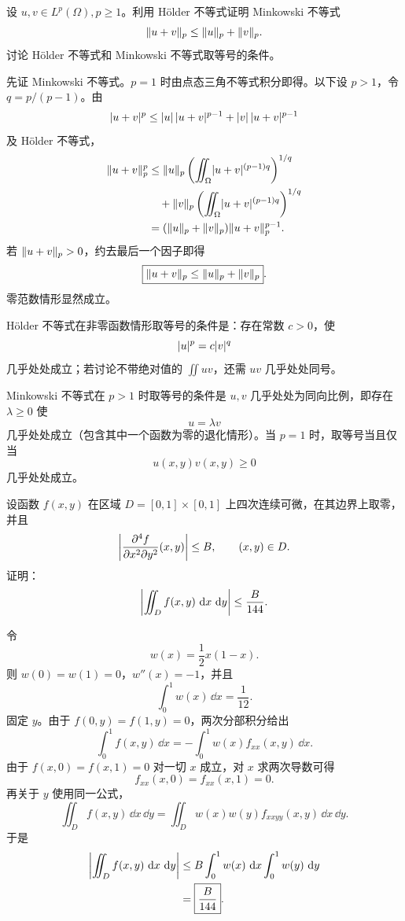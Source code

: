 \begin{xreferenceproblem}[7]
设 $u,v\in L^p(\Omega),p\ge1$。利用 Hölder 不等式证明 Minkowski 不等式
  \[
    \norm{u+v}_p\le\norm{u}_p+\norm{v}_p.
  \]
  讨论 Hölder 不等式和 Minkowski 不等式取等号的条件。
\end{xreferenceproblem}
\begin{xsolution}
先证 Minkowski 不等式。$p=1$ 时由点态三角不等式积分即得。以下设 $p>1$，令 $q=p/(p-1)$。由
\[
  \abs{u+v}^p\le\abs{u}\,\abs{u+v}^{p-1}
  +\abs{v}\,\abs{u+v}^{p-1}
\]
及 Hölder 不等式，
\begin{align*}
  \norm{u+v}_p^p
  &\le \norm{u}_p
  \left(\iint_\Omega\abs{u+v}^{(p-1)q}\right)^{1/q}\\
  &\quad+\norm{v}_p
  \left(\iint_\Omega\abs{u+v}^{(p-1)q}\right)^{1/q}\\
  &=(\norm{u}_p+\norm{v}_p)\norm{u+v}_p^{p-1}.
\end{align*}
若 $\norm{u+v}_p>0$，约去最后一个因子即得
\[
  \boxed{\norm{u+v}_p\le\norm{u}_p+\norm{v}_p}.
\]
零范数情形显然成立。

Hölder 不等式在非零函数情形取等号的条件是：存在常数 $c>0$，使
\[
  \abs{u}^p=c\abs{v}^q
\]
几乎处处成立；若讨论不带绝对值的 $\iint uv$，还需 $uv$ 几乎处处同号。

Minkowski 不等式在 $p>1$ 时取等号的条件是 $u,v$ 几乎处处为同向比例，即存在 $\lambda\ge0$ 使
\[
  u=\lambda v
\]
几乎处处成立（包含其中一个函数为零的退化情形）。当 $p=1$ 时，取等号当且仅当
\[
  u(x,y)v(x,y)\ge0
\]
几乎处处成立。
\end{xsolution}


\begin{xreferenceproblem}[8]
设函数 $f(x,y)$ 在区域 $D=[0,1]\times[0,1]$ 上四次连续可微，在其边界上取零，并且
  \[
    \abs*{\frac{\partial^4f}{\partial x^2\partial y^2}(x,y)}\le B,
    \qquad(x,y)\in D.
  \]
  证明：
  \[
    \abs*{\iint_D f(x,y)\,\dd x\,\dd y}\le\frac B{144}.
  \]
\end{xreferenceproblem}
\begin{xsolution}
令
\[
  w(x)=\frac12x(1-x).
\]
则 $w(0)=w(1)=0$，$w''(x)=-1$，并且
\[
  \int_0^1w(x)\,\dd x=\frac1{12}.
\]
固定 $y$。由于 $f(0,y)=f(1,y)=0$，两次分部积分给出
\[
  \int_0^1f(x,y)\,\dd x
  =-\int_0^1w(x)f_{xx}(x,y)\,\dd x.
\]
由于 $f(x,0)=f(x,1)=0$ 对一切 $x$ 成立，对 $x$ 求两次导数可得
\[
  f_{xx}(x,0)=f_{xx}(x,1)=0.
\]
再关于 $y$ 使用同一公式，
\[
  \iint_Df(x,y)\,\dd x\,\dd y
  =\iint_Dw(x)w(y)f_{xxyy}(x,y)\,\dd x\,\dd y.
\]
于是
\begin{align*}
 \abs*{\iint_Df(x,y)\,\dd x\,\dd y}
 &\le B\int_0^1w(x)\,\dd x\int_0^1w(y)\,\dd y\\
 &=\boxed{\frac{B}{144}}.
\end{align*}
\end{xsolution}


